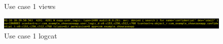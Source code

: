\begin{figure}[h!]
  \caption{\label{fig:seapp_uc1_views} Use case 1 views}
\end{figure}

\begin{figure}[h!]
  \centering
  \includegraphics[width=\textwidth]{chapters/seapp/figs/ae/UseCase1Logcat.png}
  \caption{\label{fig:seapp_uc1_logcat} Use case 1 logcat}  
\end{figure}

\newpage
      

